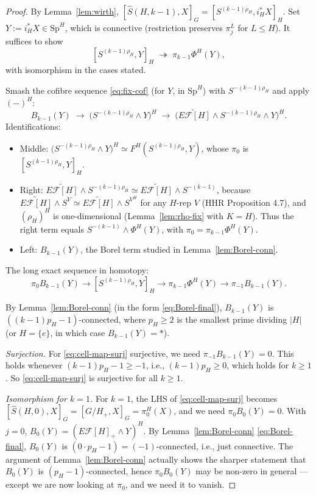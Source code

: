 \documentclass[12pt]{article}
\theoremstyle{definition}
\newcommand{\SpH}{\mathrm{Sp}^{H}}
\newcommand{\PhiH}{\Phi^{H}}
\newcommand{\fix}[1]{\widetilde{E\mathcal{F}[#1]}}
\newcommand{\Esub}[1]{E\mathcal{F}[#1]}
\begin{document}
\begin{proof}
By Lemma~\ref{lem:wirth},
$[\widehat{S}(H,k-1),X]_{G}=[S^{(k-1)\rho_{H}},i_{H}^{\ast}X]_{H}$. Set
$Y:=i_{H}^{\ast}X\in\SpH$, which is connective (restriction preserves
$\pi_{j}^{L}$ for $L\leq H$). It suffices to show
\[
[S^{(k-1)\rho_{H}},Y]_{H}\;\twoheadrightarrow\;\pi_{k-1}\PhiH(Y),
\]
with isomorphism in the cases stated.

\smallskip
Smash the cofibre sequence \eqref{eq:fix-cof} (for $Y$, in $\SpH$) with
$S^{-(k-1)\rho_{H}}$ and apply $(-)^{H}$:
\[
B_{k-1}(Y)\;\to\;\bigl(S^{-(k-1)\rho_{H}}\wedge Y\bigr)^{H}
\;\to\;\bigl(\fix{H}\wedge S^{-(k-1)\rho_{H}}\wedge Y\bigr)^{H}.
\]
Identifications:
\begin{itemize}
\item Middle: $\bigl(S^{-(k-1)\rho_{H}}\wedge Y\bigr)^{H}\simeq F^{H}(S^{(k-1)\rho_{H}},Y)$,
whose $\pi_{0}$ is $[S^{(k-1)\rho_{H}},Y]_{H}$.
\item Right: $\fix{H}\wedge S^{-(k-1)\rho_{H}}\simeq\fix{H}\wedge S^{-(k-1)}$,
because $\fix{H}\wedge S^{V}\simeq\fix{H}\wedge S^{V^{H}}$ for any $H$-rep
$V$ (HHR Proposition 4.7), and $(\rho_{H})^{H}$ is one-dimensional
(Lemma~\ref{lem:rho-fix} with $K=H$). Thus the right term equals
$S^{-(k-1)}\wedge\PhiH(Y)$, with $\pi_{0}=\pi_{k-1}\PhiH(Y)$.
\item Left: $B_{k-1}(Y)$, the Borel term studied in
Lemma~\ref{lem:Borel-conn}.
\end{itemize}

The long exact sequence in homotopy:
\[
\pi_{0}B_{k-1}(Y)\to[S^{(k-1)\rho_{H}},Y]_{H}\to\pi_{k-1}\PhiH(Y)\to
\pi_{-1}B_{k-1}(Y).
\]

By Lemma~\ref{lem:Borel-conn} (in the form \eqref{eq:Borel-final}),
$B_{k-1}(Y)$ is $((k-1)p_{H}-1)$-connected, where $p_{H}\geq 2$ is the smallest
prime dividing $|H|$ (or $H=\{e\}$, in which case $B_{k-1}(Y)=\ast$).

\smallskip
\emph{Surjection.} For \eqref{eq:cell-map-surj} surjective, we need
$\pi_{-1}B_{k-1}(Y)=0$. This holds whenever $(k-1)p_{H}-1\geq -1$, i.e.,
$(k-1)p_{H}\geq 0$, which holds for $k\geq 1$. So
\eqref{eq:cell-map-surj} is surjective for all $k\geq 1$.

\smallskip
\emph{Isomorphism for $k=1$.} For $k=1$, the LHS of
\eqref{eq:cell-map-surj} becomes $[\widehat{S}(H,0),X]_{G}=[G/H_{+},X]_{G}=
\pi_{0}^{H}(X)$, and we need $\pi_{0}B_{0}(Y)=0$. With $j=0$,
$B_{0}(Y)=(\Esub{H}_{+}\wedge Y)^{H}$. By Lemma~\ref{lem:Borel-conn}
\eqref{eq:Borel-final}, $B_{0}(Y)$ is $(0\cdot p_{H}-1)=(-1)$-connected, i.e.,
just connective. The argument of Lemma~\ref{lem:Borel-conn} actually shows the
sharper statement that $B_{0}(Y)$ is $(p_{H}-1)$-connected, hence
$\pi_{0}B_{0}(Y)$ may be non-zero in general — except we are now looking at
$\pi_{0}$, and we need it to vanish.


\end{proof}
\end{document}
